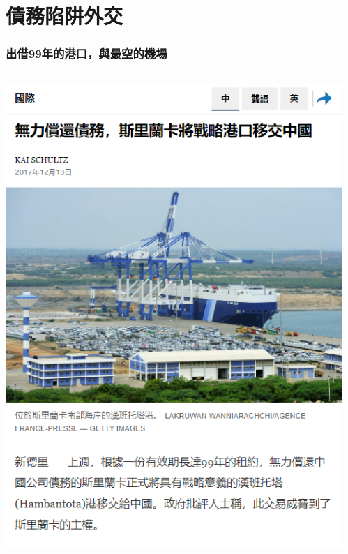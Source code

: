 \documentclass[mathserif]{beamer}
\begin{document}
    \section{債務陷阱外交}
    \begin{frame}
        \frametitle{出借99年的港口，與最空的機場}
        \begin{columns}
            \begin{column}{0.48\textwidth}
                    \includegraphics[width = \textwidth]{fig/Hambontota_news.png}
            \end{column}
            \begin{column}{0.48\textwidth}

\end{column}
\end{columns}
\end{frame}
\end{document}
